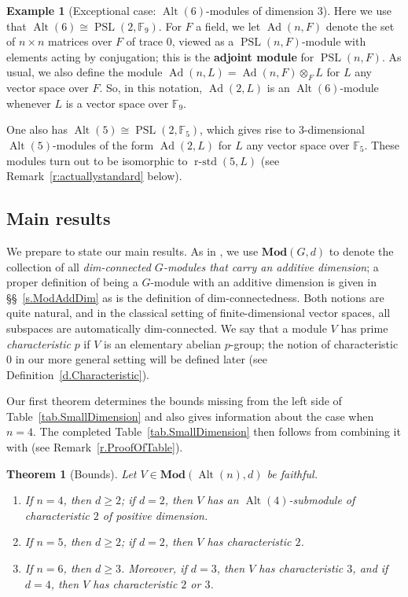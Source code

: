 \documentclass[a4paper, 11pt]{amsart}
\theoremstyle{plain}
\newcounter{MainTheoremCounter}
\newtheorem{MainTheorem}[MainTheoremCounter]{Theorem}
\theoremstyle{definition}
\newtheorem{example}[theorem]{Example}
\theoremstyle{remark}
\DeclareMathOperator{\Alt}{Alt}
\DeclareMathOperator{\rstd}{r-std}
\DeclareMathOperator{\PSL}{PSL}
\DeclareMathOperator{\Ad}{Ad}
\newcommand{\Mod}{\mathbf{Mod}}
\newcommand{\bF}{\mathbb{F}}
\begin{document}
\begin{example}[Exceptional case: $\Alt(6)$-modules of dimension $3$]\label{eg.AdPSL2}
Here we use that $\Alt(6)\cong\PSL(2,\bF_9)$. For $F$ a field, we let $\Ad(n,F)$ denote the set of $n\times n$ matrices over $F$ of trace $0$, viewed as a $\PSL(n,F)$-module with elements acting by conjugation; this is the \textbf{adjoint module} for $\PSL(n,F)$. As usual, we also define the module $\Ad(n,L) =\Ad(n,F)\otimes_{F} L$ for $L$ any vector space over $F$. So, in this notation, $\Ad(2,L)$ is an $\Alt(6)$-module whenever $L$ is a vector space over $\bF_9$.

One also has $\Alt(5)\cong\PSL(2,\bF_5)$, which gives rise to $3$-dimensional $\Alt(5)$-modules of the form $\Ad(2,L)$ for $L$ any vector space over $\bF_5$. These modules turn out to be isomorphic to $\rstd(5,L)$ (see Remark~\ref{r:actuallystandard} below).
\end{example}

\subsection{Main results}\label{ss.Results}
We  prepare to state our main results. As in \cite{CDW23}, we use $\Mod(G,d)$ to denote the collection of all \emph{dim-connected $G$-modules that carry an additive dimension}; a proper definition of being a $G$-module with an additive dimension is given in \S\S~\ref{s.ModAddDim} as is the definition of dim-connectedness. Both notions are quite natural, and in the classical setting of finite-dimensional vector spaces, all subspaces are automatically dim-connected. 
We say that a module $V$ has prime \emph{characteristic} $p$ if $V$ is an elementary abelian $p$-group; the notion of characteristic $0$ in our more general setting will be defined later (see Definition~\ref{d.Characteristic}). 

Our first theorem determines the bounds missing from the left side of Table~\ref{tab.SmallDimension} and also gives information about the case when $n= 4$. The completed Table~\ref{tab.SmallDimension} then  follows from combining it with \cite{CDW23} (see Remark~\ref{r.ProofOfTable}). 

\begin{MainTheorem}[Bounds]\label{t.AltBounds} 
Let $V\in \Mod(\Alt(n),d)$ be faithful.
\begin{enumerate}
\item If $n = 4$, then $d \ge 2$; if $d=2$, then $V$ has an  $\Alt(4)$-submodule of characteristic $2$ of positive dimension.
\item If $n = 5$, then $d \ge 2$; if $d=2$, then $V$ has characteristic $2$.
\item If $n = 6$, then $d \ge 3$. Moreover, if $d=3$, then $V$ has characteristic $3$, and if $d=4$, then $V$ has characteristic $2$ or $3$.
\end{enumerate}
\end{MainTheorem}
\end{document}
